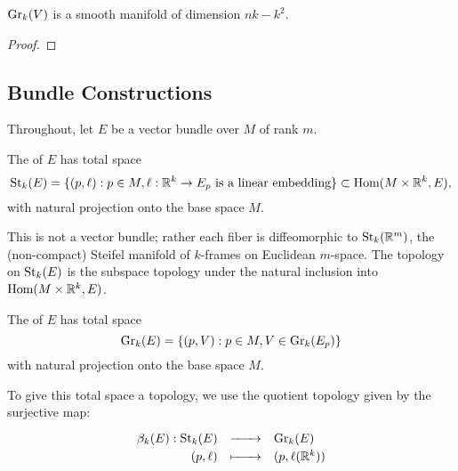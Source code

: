 \documentclass{lkx_paper}
\begin{document}
\begin{proposition}
	$\mathrm{Gr}_k(V)$ is a smooth manifold of dimension $nk-k^2$.
\end{proposition}

\begin{proof}
\end{proof}


\subsection{Bundle Constructions}

Throughout, let $E$ be a vector bundle over $M$ of rank $m$.

\begin{definition}
	The  of $E$ has total space
	\[
		\mathrm{St}_k(E) = \{ (p, \ell) : p\in M, \ell : \mathbb{R}^k \to E_p \textrm{ is a linear embedding}\} \subset \textrm{Hom}(M\times \mathbb{R}^k, E),
	\]
	with natural projection onto the base space $M$.
\end{definition}

This is not a vector bundle; rather each fiber is diffeomorphic to $\mathrm{St}_k(\mathbb{R}^m)$, the (non-compact) Steifel manifold of $k$-frames on Euclidean $m$-space. The topology on $\mathrm{St}_k(E)$ is the subspace topology under the natural inclusion into $\textrm{Hom}(M\times \mathbb{R}^k, E)$.



\begin{definition}
	The  of $E$ has total space
	\[
		\mathrm{Gr}_k(E) = \{(p, V) : p\in M, V\in \mathrm{Gr}_k(E_p) \}
	\]
	with natural projection onto the base space $M$.
\end{definition}


\begin{proposition}
\end{proposition}

To give this total space a topology, we use the quotient topology given by the surjective map:
\[
	\begin{array}{rcl}
		\beta_k(E) : \mathrm{St}_k(E) & \xrightarrow{\phantom{---}} & \mathrm{Gr}_k(E)        \\
		(p,\ell)              & \xmapsto{\phantom{---}}     & (p, \ell(\mathbb{R}^k))
	\end{array}
\]
\end{document}
